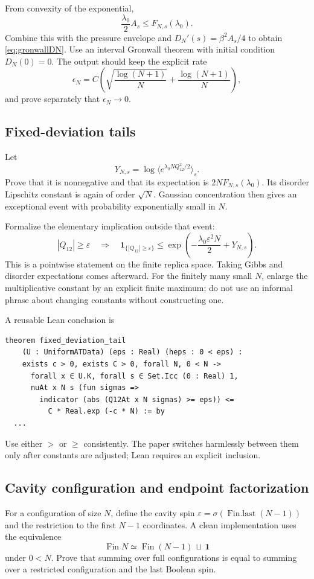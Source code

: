\documentclass[11pt]{article}
\numberwithin{equation}{section}
\newcommand{\1}{\mathbf 1}
\begin{document}
From convexity of the exponential,
\[
 \frac{\lambda_0}{2}A_s
 \le F_{N,s}(\lambda_0).
\]
Combine this with the pressure envelope and
$D_N'(s)=\beta^2A_s/4$ to obtain \eqref{eq:gronwallDN}.  Use an interval
Gronwall theorem with initial condition $D_N(0)=0$.  The output should keep
the explicit rate
\[
 \epsilon_N=C\left(\sqrt{\frac{\log(N+1)}N}
              +\frac{\log(N+1)}N\right),
\]
and prove separately that $\epsilon_N\to0$.

\subsection{Fixed-deviation tails}

Let
\[
 Y_{N,s}=\log\langle
   e^{\lambda_0NQ_{12}^2/2}\rangle_s.
\]
Prove that it is nonnegative and that its expectation is
$2NF_{N,s}(\lambda_0)$.  Its disorder Lipschitz constant is again of order
$\sqrt N$.  Gaussian concentration then gives an exceptional event with
probability exponentially small in $N$.

Formalize the elementary implication outside that event:
\[
 |Q_{12}|\ge\varepsilon
 \quad\Longrightarrow\quad
 \1_{\{|Q_{12}|\ge\varepsilon\}}
 \le
 \exp\left(-\frac{\lambda_0\varepsilon^2N}{2}
     +Y_{N,s}\right).
\]
This is a pointwise statement on the finite replica space.  Taking Gibbs and
disorder expectations comes afterward.  For the finitely many small $N$,
enlarge the multiplicative constant by an explicit finite maximum; do not
use an informal phrase about changing constants without constructing one.

A reusable Lean conclusion is
\begin{lstlisting}
theorem fixed_deviation_tail
    (U : UniformATData) (eps : Real) (heps : 0 < eps) :
    exists c > 0, exists C > 0, forall N, 0 < N ->
      forall x ∈ U.K, forall s ∈ Set.Icc (0 : Real) 1,
      nuAt x N s (fun sigmas =>
        indicator (abs (Q12At x N sigmas) >= eps)) <=
          C * Real.exp (-c * N) := by
  ...
\end{lstlisting}
Use either $>$ or $\ge$ consistently.  The paper switches harmlessly between
them only after constants are adjusted; Lean requires an explicit inclusion.

\subsection{Cavity configuration and endpoint factorization}

For a configuration of size $N$, define the cavity spin
$\varepsilon=\sigma(\operatorname{Fin.last}(N-1))$ and the restriction to
the first $N-1$ coordinates.  A clean implementation uses the equivalence
\[
 \operatorname{Fin}N\simeq \operatorname{Fin}(N-1)\,\sqcup\,\mathbf 1
\]
under $0<N$.  Prove that summing over full configurations is equal to summing
over a restricted configuration and the last Boolean spin.
\end{document}
